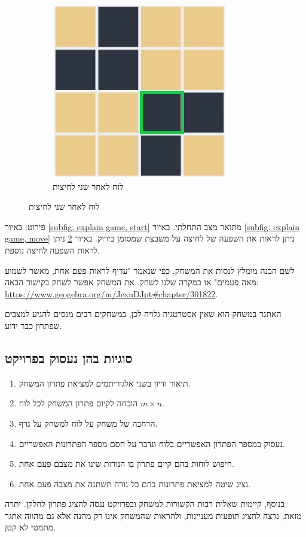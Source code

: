 \documentclass[12pt,leqno]{article}
\theoremstyle{theoremdd}
\begin{document}
\begin{figure}[ht]
\begin{subfigure}{.3\textwidth}
    \end{subfigure}%
    \begin{subfigure}{.3\textwidth}
        \caption{לוח לאחר שני לחיצות}
        \label{subfig: explain game, next move}
        \centering
        \includegraphics[scale=0.67]{images/4x4_next_press.PNG}
    \end{subfigure}%
\end{figure}
פירוט:
באיור
\ref{subfig: explain game, start}
מתואר מצב התחלתי.
באיור 
\ref{subfig: explain game, move}
ניתן לראות 
את השפעה של לחיצה על משבצת שמסומן בירוק.
באיור
\ref{subfig: explain game, next move}
ניתן לראות השפעה לחיצה נוספת.

לשם הבנה מומלץ לנסות את המשחק,
כפי שנאמר "עדיף לראות פעם אחת, מאשר לשמוע מאה פעמים"
או במקרה שלנו לשחק.
את המשחק אפשר לשחק בקישור הבאה:
\\
\url{https://www.geogebra.org/m/JexnDJpt#chapter/301822}.

האתגר במשחק הוא שאין אסטרטגיה גלויה
לכן, במשחקים רבים מנסים להגיע למצבים שפתרון כבר ידוע.

\subsection{סוגיות בהן נעסוק בפרויקט}
\begin{enumerate}
	\item 
תיאור ודיון בשני אלגוריתמים למציאת פתרון המשחק.
	\item 
הוכחה לקיום פתרון המשחק לכל לוח
	$m\times n$.
	\item 
הרחבה של משחק על לוח למשחק על גרף.
    \item 
נעסוק במספר הפתרון האפשריים בלוח ונדבר על חסם מספר הפתרונות האפשריים.
	\item 
חיפוש לוחות בהם קיים פתרון בו הנורות שינו את מצבם פעם אחת.
    \item 
נציג שיטה למציאת פתרונות בהם כל נורה תשתנה את מצבה פעם אחת.
\end{enumerate}
בנוסף, קיימות שאלות רבות הקשורות למשחק
ובפרויקט ננסה להציג פתרון לחלקן.
יתרה מזאת, נרצה להציג תופעות מעניינות, ולהראות
שהמשחק אינו רק מהנה אלא גם מהווה אתגר מתמטי לא קטן.
\end{document}
